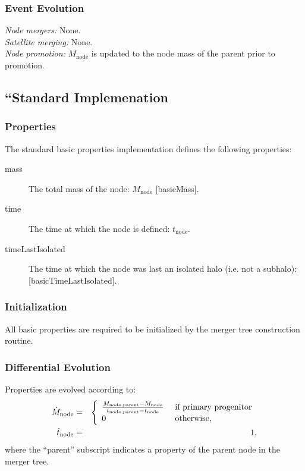 \subsubsection{Event Evolution}

\noindent\emph{Node mergers:} None.\\

\noindent\emph{Satellite merging:} None.\\

\noindent\emph{Node promotion:} $M_\mathrm{node}$ is updated to the \gls{node} mass of the parent prior to promotion.\\

\subsection{``Standard Implemenation}

\subsubsection{Properties}

The standard basic properties implementation defines the following properties:
\begin{description}
 \item [{\normalfont \ttfamily mass}] The total mass of the node: $M_\mathrm{node}$ [{\normalfont \ttfamily basicMass}].
 \item [{\normalfont \ttfamily time}] The time at which the \gls{node} is defined: $t_\mathrm{node}$.
 \item [{\normalfont \ttfamily timeLastIsolated}] The time at which the \gls{node} was last an isolated halo (i.e. not a subhalo): [\normalfont \ttfamily basicTimeLastIsolated].
\end{description}

\subsubsection{Initialization}

All basic properties are required to be initialized by the merger tree construction routine.

\subsubsection{Differential Evolution}

Properties are evolved according to:
\begin{eqnarray}
 \dot{M}_\mathrm{node} &=& \left\{\begin{array}{ll}{M_\mathrm{node, parent} - M_\mathrm{node} \over t_\mathrm{node, parent} - t_\mathrm{node}} & \hbox{ if primary progenitor} \\ 0 & \hbox{ otherwise}, \end{array} \right. \\
 \dot{t}_\mathrm{node} &=& 1,
\end{eqnarray}
where the ``parent'' subscript indicates a property of the parent \gls{node} in the merger tree.

